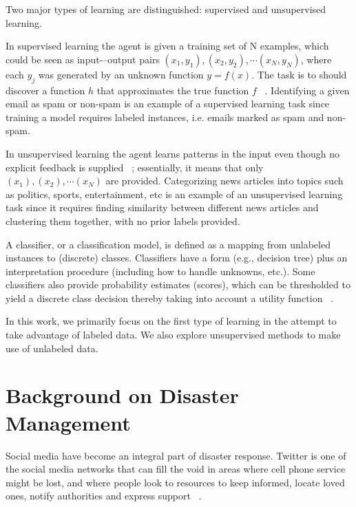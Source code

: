 Two major types of learning are distinguished: supervised and unsupervised learning.

In supervised learning the agent is given a training set of N examples, which could be seen as input-–output pairs $(x_1, y_1), (x_2, y_2), \cdots(x_N, y_N)$, where each $y_j$ was generated by an unknown function $y = f(x)$. The task is to should discover a function $h$ that approximates the true function $f$ ~\citep{rn}. Identifying a given email as spam or non-spam is an example of a supervised learning task since training a model requires labeled instances, i.e. emails marked as spam and non-spam. 

In unsupervised learning the agent learns patterns in the input even though no explicit feedback is supplied ~\citep{rn}; essentially, it means that only $(x_1), (x_2), \cdots(x_N)$ are provided. Categorizing news articles into topics such as politics, sports, entertainment, etc is an example of an unsupervised learning task since it requires finding similarity between different news articles and clustering them together, with no prior labels provided. 

A classifier, or a classification model, is defined as a mapping from unlabeled instances to (discrete) classes. Classifiers have a form (e.g., decision tree) plus an interpretation procedure (including how to handle unknowns, etc.). Some classifiers also provide probability estimates (scores), which can be thresholded to yield a discrete class decision thereby taking into account a utility function ~\citep{terms}. 

In this work, we primarily focus on the first type of learning in the attempt to take advantage of labeled data. We also explore unsupervised methods to make use of unlabeled data. 


\section{Background on Disaster Management}
\label{backgrounddisaster}

Social media have become an integral part of disaster response. Twitter is one of the social media networks that can fill the void in areas where cell phone service might be lost, and where people look to resources to keep informed, locate loved ones, notify authorities and express support ~\citep{scientificamer}.

